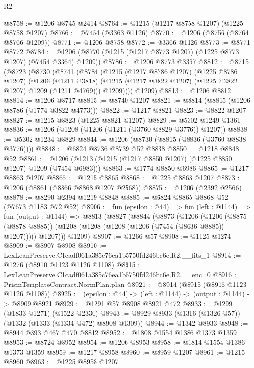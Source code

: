 \begin{lexlean}{R2}
\begin{coremodule}
@8758 := @1206 @8745 @2414
@8764 := @1215 (@1217 @8758 @1207) (@1225 @8758 @1207)
@8766 := @7454 (@3363 @1126)
@8770 := @1206 (@8756 (@8764 @8766 @1209))
@8771 := @1206 @8758
@8772 := @3366 @1126
@8773 := @8771 @8772
@8784 := @1206 (@8770 (@1215 (@1217 @8773 @1207) (@1225 @8773 @1207) (@7454 @3364) @1209))
@8786 := @1206 @8773 @3367
@8812 := @8715
    (@8723
      (@8730
        (@8741
          (@8784
            (@1215
              (@1217 @8786 @1207)
              (@1225 @8786 @1207)
              (@1206
                (@1211 @3818)
                (@1215 (@1217 @3822 @1207) (@1225 @3822 @1207) @1209 (@1211 @4769)))
              @1209))))
      @1209)
@8813 := @1206 @8812
@8814 := @1206 @8717
@8815 := @8740 @1207
@8821 := @8814 (@8815 (@1206 @8786 (@1774 @3822 @4773)))
@8822 := @1217 @8821
@8823 := @8822 @1207
@8827 := @1215 @8823 (@1225 @8821 @1207)
@8829 := @5302 @1249 @1361
@8836 := @1206 (@1208 (@1206 (@1211 (@3760 @8829 @3776)) @1207))
@8838 := @5302 @1234 @8829
@8844 := @1206 (@8730 (@8815 (@8836 (@3760 @8838 @3776))))
@8848 := @6824 @8736 @8739 @52 @8838
@8850 := @1218 @8848 @52
@8861 := @1206 (@1213 (@1215 (@1217 @8850 @1207) (@1225 @8850 @1207) @1209 (@7454 @6983)))
@8863 := @1774 @8850 @6986
@8865 := @1217 @8863 @1207
@8866 := @1215 @8865
@8868 := @1225 @8863 @1207
@8873 := @1206 (@8861 (@8866 @8868 @1207 @2568))
@8875 := @1206 (@2392 @2566)
@8878 := @8290 @2394 @1219 @8848
@8885 := @6824 @8865 @8868 @52 (@7673 @1183 @72 @52)
@8906 := fun (epsilon : @44) =>
  fun (left : @1144) =>
  fun (output : @1144) =>
  @8813
    (@8827
      (@8844
        (@8873
          (@1206
            (@1206
              (@8875 (@8878 @8885))
              (@1208 (@1208 (@1208 (@1206 (@7454 (@8636 @8885)) @1207)))))
            @1207)))
      @1209)
@8907 := @1266 @57
@8908 := @1125 @1274
@8909 := @8907 @8908
@8910 := LexLeanPreserve.C1cadf061a385c76ea1b5750fd246bc6e.R2.__fits_1
@8914 := @1276 (@8910 @1123 @1126 @1108)
@8915 := LexLeanPreserve.C1cadf061a385c76ea1b5750fd246bc6e.R2.__enc_0
@8916 := PrismTemplateContract.NormPlan.plan
@8921 := @8914 (@8915 (@8916 @1123 @1126 @1108))
@8925 := (epsilon : @44) -> (left : @1144) -> (output : @1144) -> @8909 @8921
@8929 := @1291 @57 @8908 @8921 @472
@8933 := @1299 (@1833 @1271) (@1522 @2330)
@8943 := @8929 @8933 (@1316 (@1326 @57)) (@1332 (@1333 (@1334 @472) @8908 @1309))
@8944 := @1342 @8933
@8948 := @8944 @393 @467 @470 @8812
@8952 := @1808 @1554 @1386 @1373 @1359
@8953 := @8724 @8952
@8954 := @1206 @8953
@8958 := @1814 @1554 @1386 @1373 @1359
@8959 := @1217 @8958
@8960 := @8959 @1207
@8961 := @1215 @8960
@8963 := @1225 @8958 @1207

\end{coremodule}
\end{lexlean}
